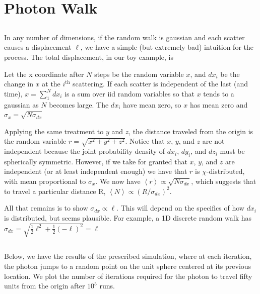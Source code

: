 \documentclass[12pt]{article}
\begin{document}
\section{Photon Walk}

\subsection{}

In any number of dimensions, if the random walk is gaussian and each scatter causes a displacement \(\ell\), we have a simple (but extremely bad) intuition for the process. The total displacement, in our toy example, is 

Let the x coordinate after \(N\) steps be the random variable \(x\), and \(dx_i\) be the change in \(x\) at the \(i^{\mathrm{th}}\) scattering. If each scatter is independent of the last (and time), \(x = \sum_1^{N} dx_i\) is a sum over iid random variables so that \(x\) tends to a gaussian as \(N\) becomes large. The \(dx_i\) have mean zero, so \(x\) has mean zero and \(\sigma_x = \sqrt{N\sigma_{dx}}\)

Applying the same treatment to \(y\) and \(z\), the distance traveled from the origin is the random variable \(r = \sqrt{x^2 + y^2 + z^2}\). Notice that \(x\), \(y\), and \(z\) are not independent because the joint probability density of \(dx_i\), \(dy_i\), and \(dz_i\) must be spherically symmetric. However, if we take for granted that \(x\), \(y\), and \(z\) are independent (or at least independent enough) we have that \(r\) is \(\chi\)-distributed, with mean proportional to \(\sigma_x\). We now have \( \left\langle r \right\rangle \propto \sqrt{N\sigma_{dx}}  \), which suggests that to travel a particular distance R, \(   \left\langle N \right\rangle \propto (R/\sigma_{dx})^2\).

All that remains is to show \(\sigma_{dx} \propto \ell\). This will depend on the specifics of how \(dx_i\) is distributed, but seems plausible. For example, a 1D discrete random walk has \(\sigma_{dx} = \sqrt{\frac{1}{2}\ell^2 + \frac{1}{2}(-\ell)^2} = \ell\)

\subsection{}

Below, we have the results of the prescribed simulation, where at each iteration, the photon jumps to a random point on the unit sphere centered at its previous location. We plot the number of iterations required for the photon to travel fifty units from the origin after \(10^5\) runs.
\end{document}

